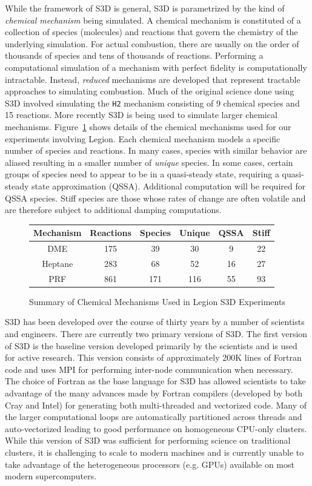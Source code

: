 While the framework of S3D is general, S3D is
parametrized by the kind of {\em chemical 
mechanism} being simulated. A chemical mechanism
is constituted of a collection of species (molecules)
and reactions that govern the chemistry of the 
underlying simulation. For actual combustion, 
there are usually on the order of thousands of 
species and tens of thousands of reactions.
Performing a computational simulation of a
mechanism with perfect fidelity is computationally
intractable. Instead, {\em reduced} mechanisms
are developed that represent tractable approaches
to simulating combustion. Much of the original 
science done using S3D involved simulating the
{\tt H2} mechanism consisting of 9 chemical
species and 15 reactions. More recently S3D
is being used to simulate larger chemical 
mechanisms. Figure~\ref{fig:s3dmech} shows
details of the chemical mechanisms used for 
our experiments involving Legion. Each chemical
mechanism models a specific number of species
and reactions. In many cases, species with 
similar behavior are aliased resulting in a 
smaller number of {\em unique} species. In some
cases, certain groups of species need to appear
to be in a quasi-steady state, requiring a 
quasi-steady state approximation (QSSA). Additional
computation will be required for QSSA species.
Stiff species are those whose rates of change are
often volatile and are therefore subject to 
additional damping computations.

\begin{figure}
\centering
\begin{tabular}{c|ccccc}
Mechanism & Reactions & Species & Unique & QSSA & Stiff \\ \hline 
DME       &  175      &  39     &   30   &  9   &  22   \\ 
Heptane   &  283      &  68     &   52   &  16  &  27   \\ 
PRF       &  861      &  171    &   116  &  55  &  93   \\
\end{tabular}
\caption{Summary of Chemical Mechanisms Used in 
Legion S3D Experiments\label{fig:s3dmech}}
\end{figure}

S3D has been developed over the course of thirty
years by a number of scientists and engineers.
There are currently two primary versions of S3D.
The first version of S3D is the baseline version 
developed primarily by the scientists and is
used for active research. This version consists
of approximately 200K lines of Fortran code and
uses MPI \cite{MPI} for performing inter-node
communication when necessary. The choice of 
Fortran as the base language for S3D has allowed
scientists to take advantage of the many advances
made by Fortran compilers (developed by both
Cray and Intel) for generating both multi-threaded
and vectorized code. Many of the larger computational
loops are automatically partitioned across threads
and auto-vectorized leading to good performance
on homogeneous CPU-only clusters. While this version
of S3D was sufficient for performing science on
traditional clusters, it is challenging to scale
to modern machines and is currently unable to take
advantage of the heterogeneous processors (e.g. GPUs)
available on most modern supercomputers.

